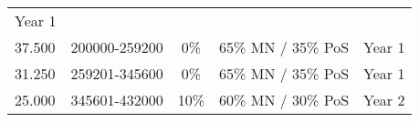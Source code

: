 \documentclass[11pt,a4paperpaper,]{report}
\begin{document}
\begin{longtable}[]{@{}llccc@{}}
\begin{minipage}[t]{0.12\columnwidth}
Year 1\strut
\end{minipage}\tabularnewline
\begin{minipage}[t]{0.12\columnwidth}\raggedright\strut
37.500\strut
\end{minipage} & \begin{minipage}[t]{0.19\columnwidth}\raggedright\strut
200000-259200\strut
\end{minipage} & \begin{minipage}[t]{0.14\columnwidth}\centering\strut
0\%\strut
\end{minipage} & \begin{minipage}[t]{0.24\columnwidth}\centering\strut
65\% MN / 35\% PoS\strut
\end{minipage} & \begin{minipage}[t]{0.12\columnwidth}\centering\strut
Year 1\strut
\end{minipage}\tabularnewline
\begin{minipage}[t]{0.12\columnwidth}\raggedright\strut
31.250\strut
\end{minipage} & \begin{minipage}[t]{0.19\columnwidth}\raggedright\strut
259201-345600\strut
\end{minipage} & \begin{minipage}[t]{0.14\columnwidth}\centering\strut
0\%\strut
\end{minipage} & \begin{minipage}[t]{0.24\columnwidth}\centering\strut
65\% MN / 35\% PoS\strut
\end{minipage} & \begin{minipage}[t]{0.12\columnwidth}\centering\strut
Year 1\strut
\end{minipage}\tabularnewline
\begin{minipage}[t]{0.12\columnwidth}\raggedright\strut
25.000\strut
\end{minipage} & \begin{minipage}[t]{0.19\columnwidth}\raggedright\strut
345601-432000\strut
\end{minipage} & \begin{minipage}[t]{0.14\columnwidth}\centering\strut
10\%\strut
\end{minipage} & \begin{minipage}[t]{0.24\columnwidth}\centering\strut
60\% MN / 30\% PoS\strut
\end{minipage} & \begin{minipage}[t]{0.12\columnwidth}\centering\strut
Year 2\strut
\end{minipage}\tabularnewline

\end{longtable}
\end{document}
